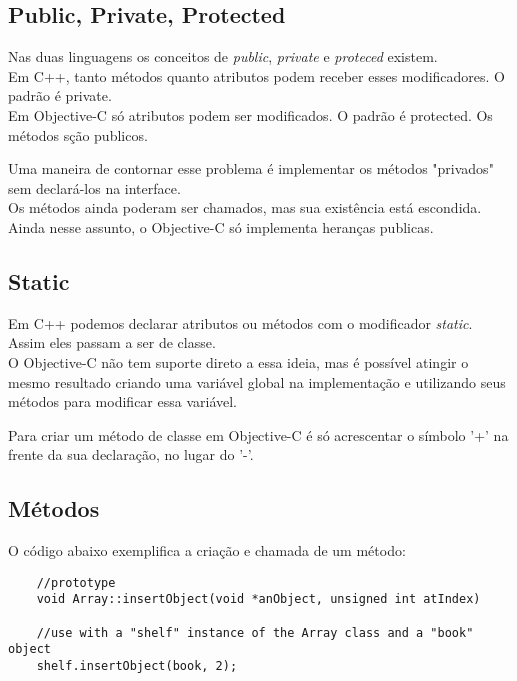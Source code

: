 \documentclass[brazil]{beamer}
\begin{document}
\subsection{Public, Private, Protected}

\begin{frame}
  Nas duas linguagens os conceitos de \textit{public}, \textit{private} e \textit{proteced} existem. \\
  Em C++, tanto métodos quanto atributos podem receber esses modificadores. O padrão é private. \\
  Em Objective-C só atributos podem ser modificados. O padrão é protected. Os métodos sção publicos.
\end{frame}

\begin{frame}
  Uma maneira de contornar esse problema é implementar os métodos "privados" sem declará-los na interface. \\
  Os métodos ainda poderam ser chamados, mas sua existência está escondida. \\
  Ainda nesse assunto, o Objective-C só implementa heranças publicas.
\end{frame}

\subsection{Static}

\begin{frame}
  Em C++ podemos declarar atributos ou métodos com o modificador \textit{static}. Assim eles passam a ser de classe. \\
  O Objective-C não tem suporte direto a essa ideia, mas é possível atingir o mesmo resultado criando uma variável global 
  na implementação e utilizando seus métodos para modificar essa variável.
\end{frame}

\begin{frame}
  Para criar um método de classe em Objective-C é só acrescentar o símbolo '+' na frente da sua declaração, no lugar do '-'.
\end{frame}

\subsection{Métodos}

\begin{frame}[fragile]
  O código abaixo exemplifica a criação e chamada de um método:
  \lstset{language=C++,basicstyle=\tiny}
  \begin{lstlisting}
    //prototype
    void Array::insertObject(void *anObject, unsigned int atIndex)
    
    //use with a "shelf" instance of the Array class and a "book" object
    shelf.insertObject(book, 2);
  \end{lstlisting}
\end{frame}
\end{document}
